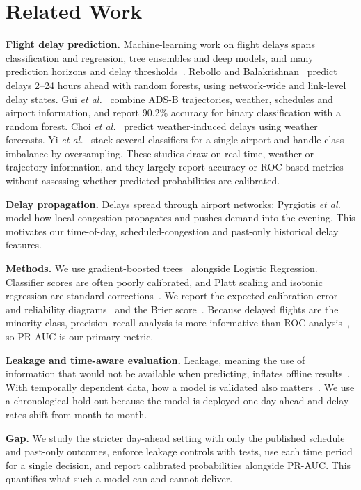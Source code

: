 \section{Related Work}
\label{sec:related}

\textbf{Flight delay prediction.} Machine-learning work on flight delays spans classification and
regression, tree ensembles and deep models, and many prediction horizons and delay
thresholds~\cite{carvalho2021relevance}. Rebollo and Balakrishnan~\cite{rebollo2014characterization}
predict delays 2--24 hours ahead with random forests, using network-wide and link-level delay
states. Gui \emph{et al.}~\cite{gui2020flight} combine ADS-B trajectories, weather, schedules and
airport information, and report 90.2\% accuracy for binary classification with a random forest.
Choi \emph{et al.}~\cite{choi2016prediction} predict weather-induced delays using weather
forecasts. Yi \emph{et al.}~\cite{yi2021flight} stack several classifiers for a single airport and
handle class imbalance by oversampling. These studies draw on real-time, weather or trajectory
information, and they largely report accuracy or ROC-based metrics without assessing whether
predicted probabilities are calibrated.

\textbf{Delay propagation.} Delays spread through airport networks: Pyrgiotis
\emph{et al.}~\cite{pyrgiotis2013modelling} model how local congestion propagates and pushes demand
into the evening. This motivates our time-of-day, scheduled-congestion and past-only historical
delay features.

\textbf{Methods.} We use gradient-boosted trees~\cite{chen2016xgboost} alongside Logistic
Regression. Classifier scores are often poorly calibrated, and Platt scaling and isotonic
regression are standard corrections~\cite{niculescu2005predicting,guo2017calibration}. We report
the expected calibration error and reliability diagrams~\cite{guo2017calibration} and the Brier
score~\cite{brier1950verification}. Because delayed flights are the minority class, precision--recall
analysis is more informative than ROC analysis~\cite{saito2015precision}, so PR-AUC is our primary
metric.

\textbf{Leakage and time-aware evaluation.} Leakage, meaning the use of information that would not
be available when predicting, inflates offline results~\cite{kaufman2012leakage}. With temporally
dependent data, how a model is validated also matters~\cite{bergmeir2012use}. We use a chronological
hold-out because the model is deployed one day ahead and delay rates shift from month to month.

\textbf{Gap.} We study the stricter day-ahead setting with only the published schedule and
past-only outcomes, enforce leakage controls with tests, use each time period for a single
decision, and report calibrated probabilities alongside PR-AUC. This quantifies what such a model
can and cannot deliver.
